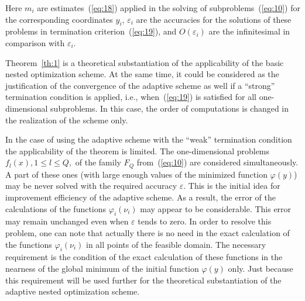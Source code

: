 \documentclass[smallextended]{svjour3}
\let\origref\ref
\renewcommand{\ref}[1]{(\origref{#1})}
\begin{document}
Here $m_i$ are estimates~\ref{eq:18} applied in the solving of subproblems~\ref{eq:10} for the corresponding coordinates $y_i$, $\varepsilon_i$ are the accuracies for the solutions of these problems in termination criterion~\ref{eq:19}, and $O(\varepsilon_i)$ are the infinitesimal in comparison with $\varepsilon_i$.

Theorem~\origref{th:1} is a theoretical substantiation of the applicability of the basic nested optimization scheme. At the same time, it could be considered as the justification of the convergence of the adaptive scheme as well if a ``strong'' termination condition is applied, i.e., when~\ref{eq:19} is satisfied for all one-dimensional subproblems. In this case, the order of computations is changed in the realization of the scheme only.

In the case of using the adaptive scheme with the ``weak'' termination condition the applicability of the theorem is limited. The one-dimensional problems $f_l(x), 1 \leq l \leq Q,$ of the family $F_Q$ from~\ref{eq:10} are considered simultaneously. A part of these ones (with large enough values of the minimized function $\varphi(y)$) may be never solved with the required accuracy $\varepsilon$. This is the initial idea for improvement efficiency of the adaptive scheme. As a result, the error of the calculations of the functions $\varphi_i(\nu_i)$ may appear to be considerable. This error may remain unchanged even when $\varepsilon$ tends to zero. In order to resolve this problem, one can note that actually there is no need in the exact calculation of the functions $\varphi_i(\nu_i)$ in all points of the feasible domain. The necessary requirement is the condition of the exact calculation of these functions in the nearness of the global minimum of the initial function $\varphi(y)$ only. Just because this requirement will be used further for the theoretical substantiation of the adaptive nested optimization scheme.
\end{document}
